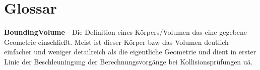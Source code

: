 \chapter{Glossar}

\textbf{BoundingVolume} - Die Definition eines Körpers/Volumen das eine gegebene Geometrie einschließt. Meist ist dieser Körper  bzw das Volumen deutlich einfacher und weniger detailreich als die eigentliche Geometrie und dient in erster Linie der Beschleuningung der Berechnungsvorgänge bei Kollisionsprüfungen uä.


% 
% 
% 
% 
% 
% 
% 
% 
% 
% 


%


